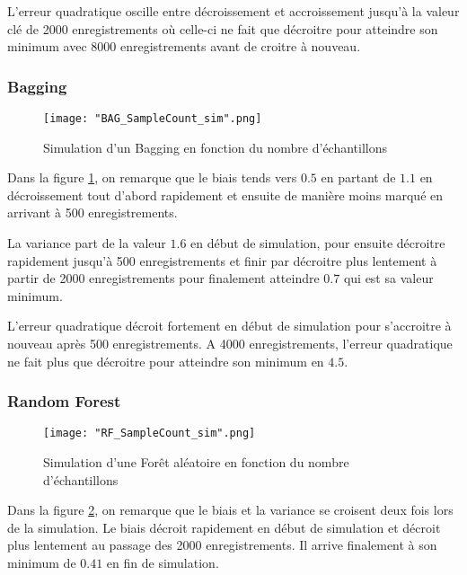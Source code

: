 \documentclass[a4paper]{article}
\begin{document}
L'erreur quadratique oscille entre décroissement et accroissement jusqu'à la valeur clé de 2000 enregistrements où celle-ci ne fait que décroitre pour atteindre son minimum avec 8000 enregistrements avant de croitre à nouveau.

\newpage

\subsubsection{Bagging}

\begin{figure}[!h]
	\centering
	\texttt{[image: "BAG\_SampleCount\_sim".png]}
	\caption{Simulation d'un Bagging en fonction du nombre d'échantillons}
	\label{BAG_SampleCount}
\end{figure}

Dans la figure \ref{BAG_SampleCount}, on remarque que le biais tends vers $0.5$ en partant de $1.1$ en décroissement tout d'abord rapidement et ensuite de manière moins marqué en arrivant à 500 enregistrements. \newline

La variance part de la valeur $1.6$ en début de simulation, pour ensuite décroitre rapidement jusqu'à 500 enregistrements et finir par décroitre plus lentement à partir de 2000 enregistrements pour finalement atteindre $0.7$ qui est sa valeur minimum. \newline

L'erreur quadratique décroit fortement en début de simulation pour s'accroitre à nouveau après 500 enregistrements. A 4000 enregistrements, l'erreur quadratique ne fait plus que décroitre pour atteindre son minimum en $4.5$.

\newpage

\subsubsection{Random Forest}

\begin{figure}[!h]
	\centering
	\texttt{[image: "RF\_SampleCount\_sim".png]}
	\caption{Simulation d'une Forêt aléatoire en fonction du nombre d'échantillons}
	\label{RF_SampleCount}
\end{figure}

Dans la figure \ref{RF_SampleCount}, on remarque que le biais et la variance se croisent deux fois lors de la simulation. Le biais décroit rapidement en début de simulation et décroit plus lentement au passage des 2000 enregistrements. Il arrive finalement à son minimum de $0.41$ en fin de simulation. \newline
\end{document}
